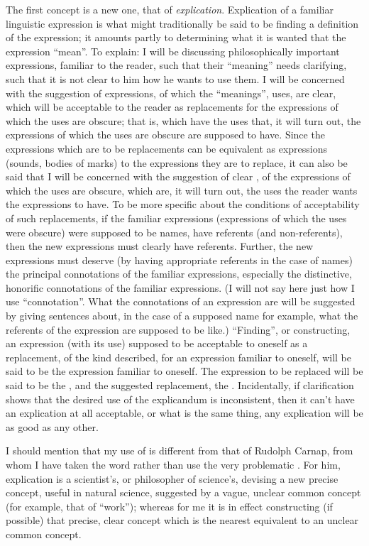 The first concept is a new one, that of \emph{explication}. Explication of a familiar linguistic expression is what might traditionally be said to be finding a definition of the expression; it amounts partly to determining what it is wanted that the expression \enquote{mean}. To explain: I will be discussing philosophically important expressions, familiar to the reader, such that their \enquote{meaning} needs clarifying, such that it is not clear to him how he wants to use them. I will be concerned with the suggestion of expressions, of which the \enquote{meanings}, uses, are clear, which will be acceptable to the reader as replacements for the expressions of which the uses are obscure; that is, which have the uses that, it will turn out, the expressions of which the uses are obscure are supposed to have. Since the expressions which are to be replacements can be equivalent as expressions (sounds, bodies of marks) to the expressions they are to replace, it can also be said that I will be concerned with the suggestion of clear , of the expressions of which the uses are obscure, which are, it will turn out, the uses the reader wants the expressions to have. To be more specific about the conditions of acceptability of such replacements, if the familiar expressions (expressions of which the uses were obscure) were supposed to be names, have referents (and non-referents), then the new expressions must clearly have referents. Further, the new expressions must deserve (by having appropriate referents in the case of names) the principal connotations of the familiar expressions, especially the distinctive, honorific connotations of the familiar expressions. (I will not say here just how I use \enquote{connotation}. What the connotations of an expression are will be suggested by giving sentences about, in the case of a supposed name for example, what the referents of the expression are supposed to be like.) \enquote{Finding}, or constructing, an expression (with its use) supposed to be acceptable to oneself as a replacement, of the kind described, for an expression familiar to oneself, will be said to be  the expression familiar to oneself. The expression to be replaced will be said to be the , and the suggested replacement, the . Incidentally, if clarification shows that the desired use of the explicandum is inconsistent, then it can't have an explication at all acceptable, or what is the same thing, any explication will be as good as any other. 

I should mention that my use of  is different from that of Rudolph Carnap, from whom I have taken the word rather than use the very problematic . For him, explication is a scientist's, or philosopher of science's, devising a new precise concept, useful in natural science, suggested by a vague, unclear common concept (for example, that of \enquote{work}); whereas for me it is in effect constructing (if possible) that precise, clear concept which is the nearest equivalent to an unclear common concept. 

